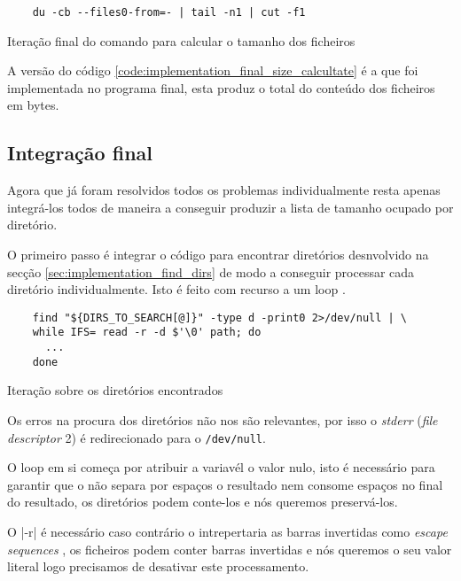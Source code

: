 \begin{listing}[H]
	\centering
	\begin{verbatim}
    du -cb --files0-from=- | tail -n1 | cut -f1
  \end{verbatim}
	\caption{Iteração final do comando para calcular o tamanho dos ficheiros}
	\label{code:implementation_final_size_calcultate}
\end{listing}

A versão do código \ref{code:implementation_final_size_calcultate} é a que foi
implementada no programa final, esta produz o total do conteúdo dos ficheiros em
bytes.

\subsection{Integração final}\label{sec:implementation_spacecheck_integration}

Agora que já foram resolvidos todos os problemas individualmente resta apenas
integrá-los todos de maneira a conseguir produzir a lista de tamanho ocupado por
diretório.

O primeiro passo é integrar o código para encontrar diretórios desnvolvido na
secção \ref{sec:implementation_find_dirs} de modo a conseguir processar cada
diretório individualmente. Isto é feito com recurso a um loop
.

\begin{listing}[H]
	\centering
	\begin{verbatim}
    find "${DIRS_TO_SEARCH[@]}" -type d -print0 2>/dev/null | \
    while IFS= read -r -d $'\0' path; do
      ...
    done
  \end{verbatim}
	\caption{Iteração sobre os diretórios encontrados}
\end{listing}

Os erros na procura dos diretórios não nos são relevantes, por isso o
\emph{stderr} (\emph{file descriptor} 2) é redirecionado para o
\Verb|/dev/null|.

O loop em si começa por atribuir a variavél  o valor nulo, isto
é necessário para garantir que o \bashinline{read} não separa por espaços o
resultado nem consome espaços no final do resultado, os diretórios podem
conte-los e nós queremos preservá-los.

O \bashinline|-r| é necessário caso contrário o  intrepertaria
as barras invertidas como \emph{escape sequences} \cite[3191-3193]{posix}, os
ficheiros podem conter barras invertidas e nós queremos o seu valor literal logo
precisamos de desativar este processamento.

